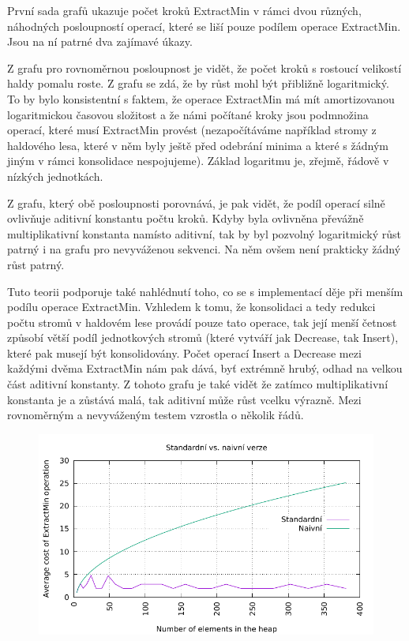 \documentclass[12pt,a4paper]{report}
\begin{document}
První sada grafů ukazuje počet kroků ExtractMin v rámci dvou různých, náhodných posloupností operací, které se liší pouze podílem operace ExtractMin. Jsou na ní patrné dva zajímavé úkazy. 

Z grafu pro rovnoměrnou posloupnost je vidět, že počet kroků s rostoucí velikostí haldy pomalu roste. Z grafu se zdá, že by růst mohl být přibližně logaritmický. To by bylo konsistentní s faktem, že operace ExtractMin má mít amortizovanou logaritmickou časovou složitost a že námi počítané kroky jsou podmnožina operací, které musí ExtractMin provést (nezapočítáváme například stromy z haldového lesa, které v něm byly ještě před odebrání minima a které s žádným jiným v rámci konsolidace nespojujeme). Základ logaritmu je, zřejmě, řádově v nízkých jednotkách. 

Z grafu, který obě posloupnosti porovnává, je pak vidět, že podíl operací silně ovlivňuje aditivní konstantu počtu kroků. Kdyby byla ovlivněna převážně multiplikativní konstanta namísto aditivní, tak by byl pozvolný logaritmický růst patrný i na grafu pro nevyváženou sekvenci. Na něm ovšem není prakticky žádný růst patrný. 

Tuto teorii podporuje také nahlédnutí toho, co se s implementací děje při menším podílu operace ExtractMin. Vzhledem k tomu, že konsolidaci a tedy redukci počtu stromů v haldovém lese provádí pouze tato operace, tak její menší četnost způsobí větší podíl jednotkových stromů (které vytváří jak Decrease, tak Insert), které pak musejí být konsolidovány. Počet operací Insert a Decrease mezi každými dvěma ExtractMin nám pak dává, byť extrémně hrubý, odhad na velkou část aditivní konstanty. Z tohoto grafu je také vidět že zatímco multiplikativní konstanta je a zůstává malá, tak aditivní může růst vcelku výrazně. Mezi rovnoměrným a nevyváženým testem vzrostla o několik řádů.


	\begin{figure}[h]	
		\centering	
		\includegraphics[scale=1.1]{graph_2}		
	\end{figure}
\end{document}
